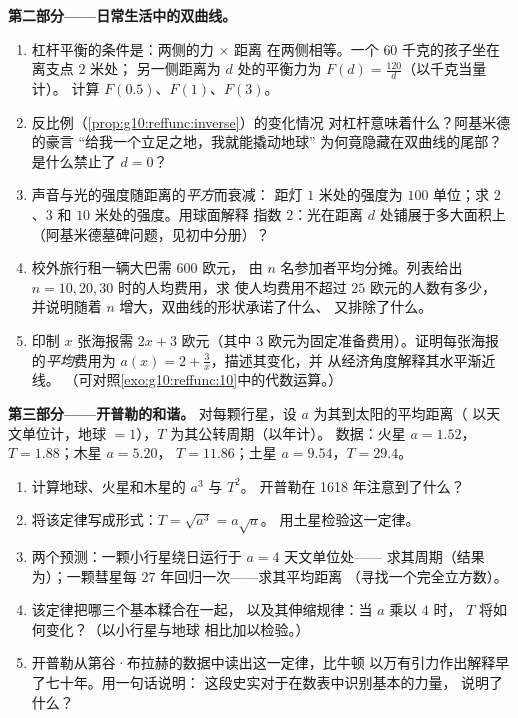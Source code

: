 \begin{problem}
\medskip
\noindent\textbf{第二部分——日常生活中的双曲线。}
\begin{enumerate}[resume]
  \item 杠杆平衡的条件是：两侧的力 $\times$ 距离
        在两侧相等。一个 $60$ 千克的孩子坐在离支点 $2$ 米处；
        另一侧距离为 $d$ 处的平衡力为
        $F(d) = \frac{120}{d}$（以千克当量计）。
        计算 $F(0.5)$、$F(1)$、$F(3)$。
  \item 反比例（\cref{prop:g10:reffunc:inverse}）的变化情况
        对杠杆意味着什么？阿基米德的豪言
        “给我一个立足之地，我就能撬动地球”
        为何竟隐藏在双曲线的尾部？
        是什么禁止了 $d = 0$？
  \item 声音与光的强度随距离的\emph{平方}而衰减：
        距灯 $1$ 米处的强度为 $100$ 单位；求 $2$、$3$
        和 $10$ 米处的强度。用球面解释
        指数 $2$：光在距离 $d$ 处铺展于多大面积上
        （阿基米德墓碑问题，见初中分册）？
  \item 校外旅行租一辆大巴需 $600$ 欧元，
        由 $n$ 名参加者平均分摊。列表给出
        $n = 10, 20, 30$ 时的人均费用，求
        使人均费用不超过 $25$ 欧元的人数有多少，
        并说明随着 $n$ 增大，双曲线的形状承诺了什么、
        又排除了什么。
  \item 印制 $x$ 张海报需 $2x + 3$ 欧元（其中
        $3$ 欧元为固定准备费用）。证明每张海报的\emph{平均}费用为
        $a(x) = 2 + \frac3x$，描述其变化，并
        从经济角度解释其水平渐近线。
        （可对照\cref{exo:g10:reffunc:10}中的代数运算。）
\end{enumerate}

\medskip
\noindent\textbf{第三部分——开普勒的和谐。}
对每颗行星，设 $a$ 为其到太阳的平均距离（
以天文单位计，地球 $= 1$），$T$ 为其公转周期（以年计）。
数据：火星 $a = 1.52$，$T = 1.88$；木星 $a = 5.20$，
$T = 11.86$；土星 $a = 9.54$，$T = 29.4$。
\begin{enumerate}[resume]
  \item 计算地球、火星和木星的 $a^3$ 与 $T^2$。
        开普勒在 1618 年注意到了什么？
  \item 将该定律写成形式：$T = \sqrt{a^3} = a\sqrt a$。
        用土星检验这一定律。
  \item 两个预测：一颗小行星绕日运行于 $a = 4$ 天文单位处——
        求其周期（结果为）；一颗彗星每
        $27$ 年回归一次——求其平均距离
        （寻找一个完全立方数）。
  \item 该定律把哪三个基本糅合在一起，
        以及其伸缩规律：当 $a$ 乘以 $4$ 时，
        $T$ 将如何变化？（以小行星与地球
        相比加以检验。）
  \item 开普勒从第谷·布拉赫的数据中读出这一定律，比牛顿
        以万有引力作出解释早了七十年。用一句话说明：
        这段史实对于在数表中识别基本的力量，
        说明了什么？
\end{enumerate}


\end{problem}

